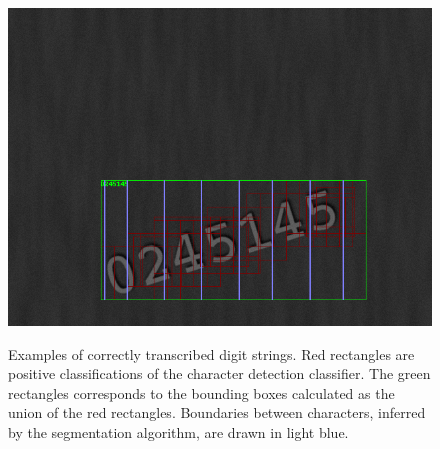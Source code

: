 \documentclass[11pt]{article}
\begin{document}
\begin{figure}[ht!]
{        \includegraphics[width=0.35\linewidth]{fig/good_examples_pipeline/c572f505-791b-45be-bf60-9761fd9eb1b6}
    }
    \caption{Examples of correctly transcribed digit strings. Red rectangles are positive classifications of the
    character detection classifier. The green rectangles corresponds to the bounding boxes calculated as the union
    of the red rectangles. Boundaries between characters, inferred by the segmentation algorithm, are drawn in light blue.}
    \label{fig:good_examples_pipeline}
\end{figure}
\end{document}
